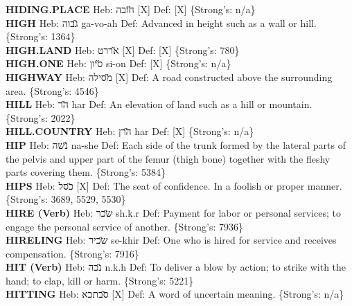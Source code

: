 {\textbf{HIDING.PLACE} Heb: {\large\H חובה} {[}X{]} Def: {[}X{]} \{Strong's: n/a\}\hfill{}\\

\textbf{HIGH} Heb: {\large\H גבוה} ga-vo-ah Def: Advanced in height such as a wall or hill. \{Strong's: 1364\}\hfill{}\\

\textbf{HIGH.LAND} Heb: {\large\H אררט} {[}X{]} Def: {[}X{]} \{Strong's: 780\}\hfill{}\\

\textbf{HIGH.ONE} Heb: {\large\H סיון} si-on Def: {[}X{]} \{Strong's: n/a\}\hfill{}\\

\textbf{HIGHWAY} Heb: {\large\H מסילה} {[}X{]} Def: A road constructed above the surrounding area. \{Strong's: 4546\}\hfill{}\\

\textbf{HILL} Heb: {\large\H הר} har Def: An elevation of land such as a hill or mountain. \{Strong's: 2022\}\hfill{}\\

\textbf{HILL.COUNTRY} Heb: {\large\H הרן} har Def: {[}X{]} \{Strong's: n/a\}\hfill{}\\

\textbf{HIP} Heb: {\large\H נשה} na-she Def: Each side of the trunk formed by the lateral parts of the pelvis and upper part of the femur (thigh bone) together with the fleshy parts covering them. \{Strong's: 5384\}\hfill{}\\

\textbf{HIPS} Heb: {\large\H כסל} {[}X{]} Def: The seat of confidence. In a foolish or proper manner. \{Strong's: 3689, 5529, 5530\}\hfill{}\\

\textbf{HIRE (Verb)} Heb: {\large\H שכר} sh.k.r Def: Payment for labor or personal services; to engage the personal service of another. \{Strong's: 7936\}\hfill{}\\

\textbf{HIRELING} Heb: {\large\H שכיר} se-khir Def: One who is hired for service and receives compensation. \{Strong's: 7916\}\hfill{}\\

\textbf{HIT (Verb)} Heb: {\large\H נכה} n.k.h Def: To deliver a blow by action; to strike with the hand; to clap, kill or harm. \{Strong's: 5221\}\hfill{}\\

\textbf{HITTING} Heb: {\large\H סבתכא} {[}X{]} Def: A word of uncertain meaning. \{Strong's: n/a\}\hfill{}\\

}
